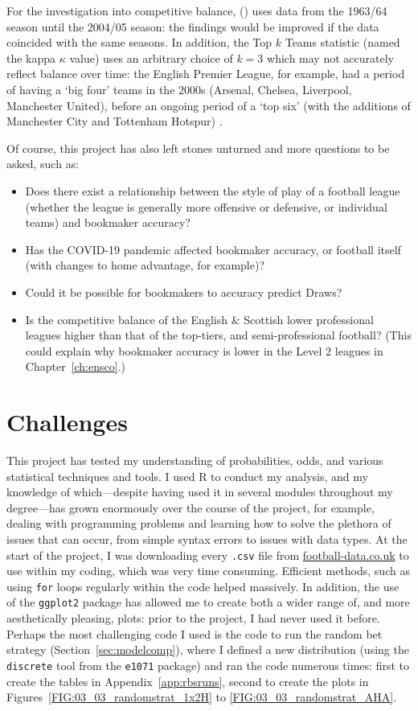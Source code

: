 \documentclass[a4paper,10pt]{report}
\begin{document}
For the investigation into competitive balance, \citeauthor{Goossens05} (\citeyear{Goossens05}) uses data from the 1963/64 season until the 2004/05 season: the findings would be improved if the data coincided with the same seasons. In addition, the Top $k$ Teams statistic (named the kappa $\kappa$ value) uses an arbitrary choice of $k=3$ which may not accurately reflect balance over time: the English Premier League, for example, had a period of having a `big four' teams in the 2000s (Arsenal, Chelsea, Liverpool, Manchester United), before an ongoing period of a `top six' (with the additions of Manchester City and Tottenham Hotspur) \autocite{kelly21}.

Of course, this project has also left stones unturned and more questions to be asked, such as:
\begin{itemize}
	\item Does there exist a relationship between the style of play of a football league (whether the league is generally more offensive or defensive, or individual teams) and bookmaker accuracy?
	\item Has the COVID-19 pandemic affected bookmaker accuracy, or football itself (with changes to home advantage, for example)?
	\item Could it be possible for bookmakers to accuracy predict Draws?
	\item Is the competitive balance of the English \& Scottish lower professional leagues higher than that of the top-tiers, and semi-professional football? (This could explain why bookmaker accuracy is lower in the Level 2 leagues in Chapter~\ref{ch:ensco}.)
\end{itemize}

\pagebreak
\section{Challenges} \label{sec:challenges}

This project has tested my understanding of probabilities, odds, and various statistical techniques and tools. I used R to conduct my analysis, and my knowledge of which---despite having used it in several modules throughout my degree---has grown enormously over the course of the project, for example, dealing with programming problems and learning how to solve the plethora of issues that can occur, from simple syntax errors to issues with data types. At the start of the project, I was downloading every \lstinline|.csv| file from \url{football-data.co.uk} to use within my coding, which was very time consuming. Efficient methods, such as using \lstinline|for| loops regularly within the code helped massively. In addition, the use of the \lstinline|ggplot2| package has allowed me to create both a wider range of, and more aesthetically pleasing, plots: prior to the project, I had never used it before. Perhaps the most challenging code I used is the code to run the random bet strategy (Section~\ref{sec:modelcomp}), where I defined a new distribution (using the \lstinline|discrete| tool from the \lstinline|e1071| package) and ran the code numerous times: first to create the tables in Appendix~\ref{app:rbsruns}, second to create the plots in Figures~\ref{FIG:03_03_randomstrat_1x2H} to \ref{FIG:03_03_randomstrat_AHA}.
\end{document}
